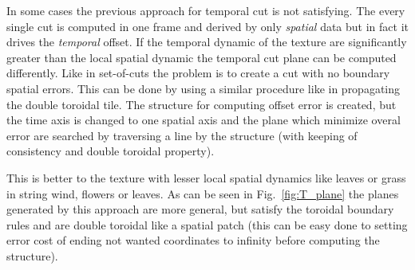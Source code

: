 	In some cases the previous approach for temporal cut is not satisfying. The every single cut is computed in one frame and derived by only \emph{spatial} data but in fact it drives the \emph{temporal} offset. If the temporal dynamic of the texture are significantly greater than the local spatial dynamic the temporal cut plane can be computed differently. Like in set-of-cuts the problem is to create a cut with no boundary spatial errors. This can be done by using a similar procedure like in propagating the double toroidal tile. The structure for computing offset error is created, but the time axis is changed to one spatial axis and the plane which minimize overal error are searched by traversing a line by the structure (with keeping of consistency and double toroidal property). %
	

	   This is better to the texture with lesser local spatial dynamics like leaves or grass in string wind, flowers or leaves. As can be seen in Fig.~\ref{fig:T_plane} the planes generated by this approach are more general, but satisfy the toroidal boundary rules and are double toroidal like a spatial patch (this can be easy done to setting error cost of ending not wanted coordinates to infinity before computing the structure). %
	
